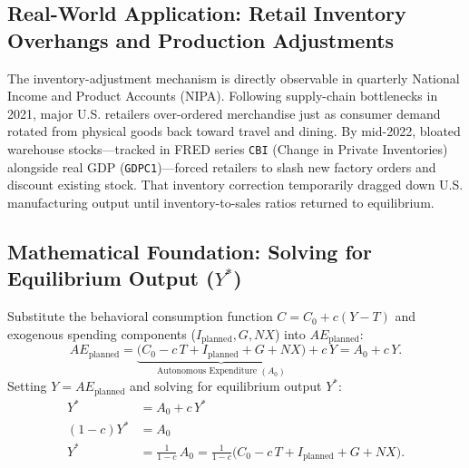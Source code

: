 \documentclass[11pt,letterpaper]{article}
\begin{document}
\subsection*{Real-World Application: Retail Inventory Overhangs and Production Adjustments}
The inventory-adjustment mechanism is directly observable in quarterly National Income and Product Accounts (NIPA). Following supply-chain bottlenecks in 2021, major U.S. retailers over-ordered merchandise just as consumer demand rotated from physical goods back toward travel and dining. By mid-2022, bloated warehouse stocks—tracked in FRED series \texttt{CBI} (Change in Private Inventories) alongside real GDP (\texttt{GDPC1})—forced retailers to slash new factory orders and discount existing stock. That inventory correction temporarily dragged down U.S. manufacturing output until inventory-to-sales ratios returned to equilibrium.

\subsection*{Mathematical Foundation: Solving for Equilibrium Output ($Y^*$)}
Substitute the behavioral consumption function $C = C_0 + c(Y - T)$ and exogenous spending components ($I_{\text{planned}}, G, NX$) into $AE_{\text{planned}}$:
\begin{equation}
AE_{\text{planned}} = \underbrace{\bigl(C_0 - c\,T + I_{\text{planned}} + G + NX\bigr)}_{\text{Autonomous Expenditure } (A_0)} + c\,Y = A_0 + c\,Y.
\end{equation}
Setting $Y = AE_{\text{planned}}$ and solving for equilibrium output $Y^*$:
\begin{align}
Y^* &= A_0 + c\,Y^* \nonumber \\
(1 - c)Y^* &= A_0 \nonumber \\
Y^* &= \frac{1}{1 - c}\,A_0 = \frac{1}{1 - c}\bigl(C_0 - c\,T + I_{\text{planned}} + G + NX\bigr). \label{eq:ch8-equilibrium}
\end{align}
\end{document}
